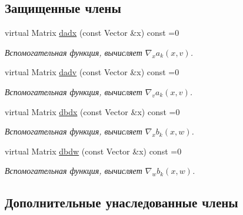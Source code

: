 \subsection*{Защищенные члены}
\begin{DoxyCompactItemize}
\item 
\hypertarget{class_core_1_1_discrete_task_a4fd463183eb4a6cf8fe55d0579adae47}{}\label{class_core_1_1_discrete_task_a4fd463183eb4a6cf8fe55d0579adae47} 
virtual Matrix \hyperlink{class_core_1_1_discrete_task_a4fd463183eb4a6cf8fe55d0579adae47}{dadx} (const Vector \&x) const =0
\begin{DoxyCompactList}\small\item\em Вспомогательная функция, вычисляет $\nabla_x a_k(x,v)$. \end{DoxyCompactList}\item 
\hypertarget{class_core_1_1_discrete_task_adcf68e112d0f30dabe00a754a4760161}{}\label{class_core_1_1_discrete_task_adcf68e112d0f30dabe00a754a4760161} 
virtual Matrix \hyperlink{class_core_1_1_discrete_task_adcf68e112d0f30dabe00a754a4760161}{dadv} (const Vector \&x) const =0
\begin{DoxyCompactList}\small\item\em Вспомогательная функция, вычисляет $\nabla_v a_k(x,v)$. \end{DoxyCompactList}\item 
\hypertarget{class_core_1_1_discrete_task_ac7944bf297b9fba78e35428afa05bf89}{}\label{class_core_1_1_discrete_task_ac7944bf297b9fba78e35428afa05bf89} 
virtual Matrix \hyperlink{class_core_1_1_discrete_task_ac7944bf297b9fba78e35428afa05bf89}{dbdx} (const Vector \&x) const =0
\begin{DoxyCompactList}\small\item\em Вспомогательная функция, вычисляет $\nabla_x b_k(x,w)$. \end{DoxyCompactList}\item 
\hypertarget{class_core_1_1_discrete_task_a6ed33be26249cbe572b55cca7614c071}{}\label{class_core_1_1_discrete_task_a6ed33be26249cbe572b55cca7614c071} 
virtual Matrix \hyperlink{class_core_1_1_discrete_task_a6ed33be26249cbe572b55cca7614c071}{dbdw} (const Vector \&x) const =0
\begin{DoxyCompactList}\small\item\em Вспомогательная функция, вычисляет $\nabla_w b_k(x,w)$. \end{DoxyCompactList}\end{DoxyCompactItemize}
\subsection*{Дополнительные унаследованные члены}


